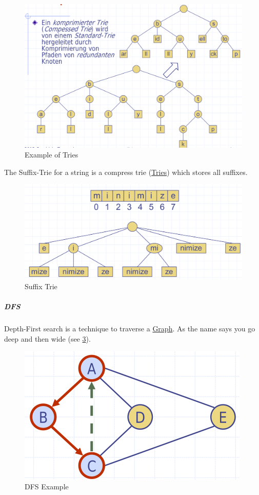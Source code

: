 \documentclass[11pt,twoside,twocolumn,landscape]{article}
\begin{document}
\begin{figure}[htbp]
\centering
\includegraphics[width=.9\linewidth]{img/tries.png}
\caption{\label{fig:org8d94e0d}Example of Tries}
\end{figure}


The Suffix-Trie for a string is a compress trie (\href{../../../roam/20220201152933-tries.org}{Tries}) which stores all suffixes.

\begin{figure}[htbp]
\centering
\includegraphics[width=.9\linewidth]{img/suffix_trie.png}
\caption{\label{fig:org253316a}Suffix Trie}
\end{figure}

\subparagraph{DFS}
\label{sec:orgf238a37}

Depth-First search is a technique to traverse a \href{../../../roam/20220201163000-graph.org}{Graph}.
As the name says you go deep and then wide (see \ref{fig:org33b270d}).


\begin{figure}[htbp]
\centering
\includegraphics[width=.9\linewidth]{img/dfs.png}
\caption{\label{fig:org33b270d}DFS Example}
\end{figure}
\end{document}
